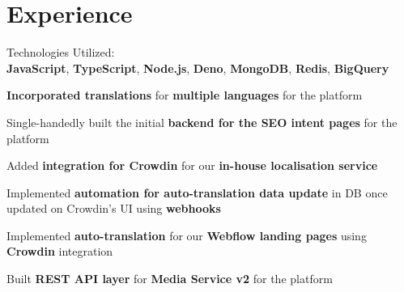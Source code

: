 \documentclass[]{deedy-resume-openfont}
\begin{document}
\begin{minipage}[t]{0.33\textwidth}

%
%

\end{minipage} 
\hfill
\begin{minipage}[t]{0.66\textwidth} 


\section{Experience}
\sectionsep

\sectionsep
\begin{tightemize}
\item Technologies Utilized: \\\textbf{JavaScript}, \textbf{TypeScript}, \textbf{Node.js}, \textbf{Deno}, \textbf{MongoDB}, \textbf{Redis}, \textbf{BigQuery}
\item \textbf{Incorporated translations} for \textbf{multiple languages} for the platform
\item Single-handedly built the initial \textbf{backend for the SEO intent pages} for the platform
\item Added \textbf{integration for Crowdin} for our \textbf{in-house localisation service}
\item Implemented \textbf{automation for auto-translation data update} in DB once updated on Crowdin's UI using \textbf{webhooks}
\item Implemented \textbf{auto-translation} for our \textbf{Webflow landing pages} using \textbf{Crowdin} integration
\item Built \textbf{REST API layer} for \textbf{Media Service v2} for the platform
\end{tightemize}
\sectionsep


\end{minipage}
\end{document}
